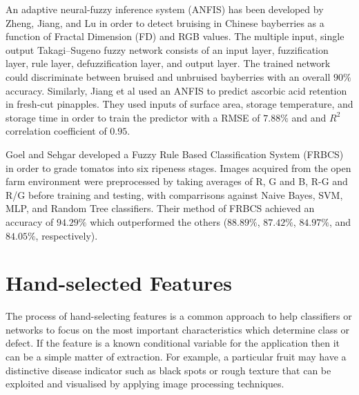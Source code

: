 \documentclass[fleqn,twoside,12pt]{report}
\begin{document}
An adaptive neural-fuzzy inference system (ANFIS) has been developed by Zheng, Jiang, and Lu \cite{zheng} in order to detect bruising in Chinese bayberries as a function of Fractal Dimension (FD) and RGB values. The multiple input, single output Takagi–Sugeno fuzzy network consists of an input layer, fuzzification layer, rule layer, defuzzification layer, and output layer. The trained network could discriminate between bruised and unbruised bayberries with an overall $90\%$ accuracy. Similarly, Jiang et al \cite{jiang} used an ANFIS to predict ascorbic acid retention in fresh-cut pinapples. They used inputs of surface area, storage temperature, and storage time in order to train the predictor with a RMSE of $7.88\%$ and and $R^2$ correlation coefficient of $0.95$.

Goel and Sehgar \cite{goel} developed a Fuzzy Rule Based Classification System (FRBCS) in order to grade tomatos into six ripeness stages. Images acquired from the open farm environment were preprocessed by taking averages of R, G and B, R-G and R/G before training and testing, with comparrisons against Naive Bayes, SVM, MLP, and Random Tree classifiers. Their method of FRBCS achieved an accuracy of $94.29\%$ which outperformed the others ($88.89\%$, $87.42\%$, $84.97\%$, and $84.05\%$, respectively).  




\section{Hand-selected Features}

The process of hand-selecting features is a common approach to help classifiers or networks to focus on the most important characteristics which determine class or defect. If the feature is a known conditional variable for the application then it can be a simple matter of extraction. For example, a particular fruit may have a distinctive disease indicator such as black spots or rough texture that can be exploited and visualised by applying image processing techniques. 
\end{document}
